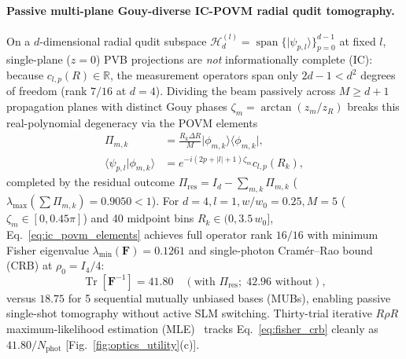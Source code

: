 \documentclass[aps,pra,onecolumn,notitlepage,11pt,tightenlines,amsmath,amssymb,floatfix,longbibliography]{revtex4-2}
\providecommand{\bra}[1]{\langle#1\rvert}
\providecommand{\ket}[1]{\lvert#1\rangle}
\providecommand{\braket}[2]{\langle#1\vert#2\rangle}
\providecommand{\abs}[1]{\lvert#1\rvert}
\begin{document}
\paragraph*{Passive multi-plane Gouy-diverse IC-POVM radial qudit tomography.}
On a $d$-dimensional radial qudit subspace $\mathcal{H}_d^{(l)} = \operatorname{span}\{\ket{\psi_{p,l}}\}_{p=0}^{d-1}$ at fixed $l$, single-plane ($z=0$) PVB projections are \emph{not} informationally complete (IC): because $c_{l,p}(R) \in \mathbb{R}$, the measurement operators span only $2d-1 < d^2$ degrees of freedom (rank $7/16$ at $d=4$). Dividing the beam passively across $M \ge d+1$ propagation planes with distinct Gouy phases $\zeta_m = \arctan(z_m/z_R)$ breaks this real-polynomial degeneracy via the POVM elements~\cite{Renes2004}
\begin{align}
\Pi_{m,k} &= \frac{R_k \Delta R}{M}\ket{\phi_{m,k}}\bra{\phi_{m,k}}, \nonumber \\
\braket{\psi_{p,l}}{\phi_{m,k}} &= e^{-i(2p+\abs{l}+1)\zeta_m} c_{l,p}(R_k),
\label{eq:ic_povm_elements}
\end{align}
completed by the residual outcome $\Pi_{\mathrm{res}} = I_d - \sum_{m,k}\Pi_{m,k}$ ($\lambda_{\max}(\sum \Pi_{m,k}) = 0.9050 < 1$). For $d=4, l=1, w/w_0=0.25, M=5$ ($\zeta_m \in [0,0.45\pi]$) and 40 midpoint bins $R_k \in (0, 3.5\,w_0]$, Eq.~\eqref{eq:ic_povm_elements} achieves full operator rank $16/16$ with minimum Fisher eigenvalue $\lambda_{\min}(\mathbf{F}) = 0.1261$ and single-photon Cram\'er--Rao bound (CRB) at $\rho_0 = I_4/4$:
\begin{equation}
\operatorname{Tr}\!\left[\mathbf{F}^{-1}\right] = 41.80 \quad (\text{with }\Pi_{\mathrm{res}};\; 42.96\text{ without}),
\label{eq:fisher_crb}
\end{equation}
versus $18.75$ for 5 sequential mutually unbiased bases (MUBs), enabling passive single-shot tomography without active SLM switching. Thirty-trial iterative $R\rho R$ maximum-likelihood estimation (MLE)~\cite{Lvovsky2004} tracks Eq.~\eqref{eq:fisher_crb} cleanly as $41.80/N_{\mathrm{phot}}$ [Fig.~\ref{fig:optics_utility}(c)].
\end{document}

